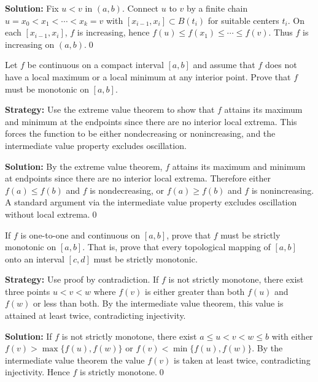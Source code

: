 \bigskip\noindent\textbf{Solution:}
Fix $u<v$ in $(a,b)$. Connect $u$ to $v$ by a finite chain $u=x_0<x_1<\cdots<x_k=v$ with $[x_{i-1},x_i]\subset B(t_i)$ for suitable centers $t_i$. On each $[x_{i-1},x_i]$, $f$ is increasing, hence $f(u)\le f(x_1)\le\cdots\le f(v)$. Thus $f$ is increasing on $(a,b)$.\qed



\begin{problembox}
\begin{problemstatement}
Let $f$ be continuous on a compact interval $[a, b]$ and assume that $f$ does not have a local maximum or a local minimum at any interior point. Prove that $f$ must be monotonic on $[a, b]$.
\end{problemstatement}
\end{problembox}

\noindent\textbf{Strategy:} Use the extreme value theorem to show that $f$ attains its maximum and minimum at the endpoints since there are no interior local extrema. This forces the function to be either nondecreasing or nonincreasing, and the intermediate value property excludes oscillation.

\bigskip\noindent\textbf{Solution:}
By the extreme value theorem, $f$ attains its maximum and minimum at endpoints since there are no interior local extrema. Therefore either $f(a)\le f(b)$ and $f$ is nondecreasing, or $f(a)\ge f(b)$ and $f$ is nonincreasing. A standard argument via the intermediate value property excludes oscillation without local extrema.\qed



\begin{problembox}
\begin{problemstatement}
If $f$ is one-to-one and continuous on $[a, b]$, prove that $f$ must be strictly monotonic on $[a, b]$. That is, prove that every topological mapping of $[a, b]$ onto an interval $[c, d]$ must be strictly monotonic.
\end{problemstatement}
\end{problembox}

\noindent\textbf{Strategy:} Use proof by contradiction. If $f$ is not strictly monotone, there exist three points $u < v < w$ where $f(v)$ is either greater than both $f(u)$ and $f(w)$ or less than both. By the intermediate value theorem, this value is attained at least twice, contradicting injectivity.

\bigskip\noindent\textbf{Solution:}
If $f$ is not strictly monotone, there exist $a\le u<v<w\le b$ with either $f(v)>\max\{f(u),f(w)\}$ or $f(v)<\min\{f(u),f(w)\}$. By the intermediate value theorem the value $f(v)$ is taken at least twice, contradicting injectivity. Hence $f$ is strictly monotone.\qed



